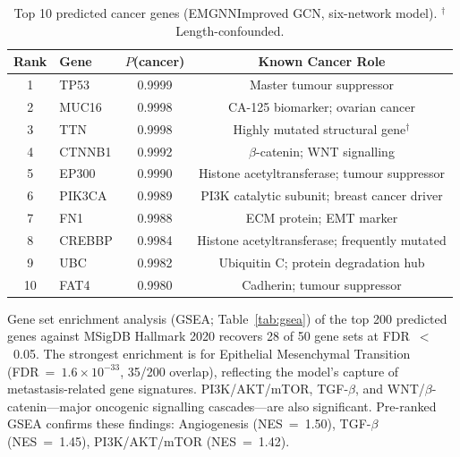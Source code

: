 \begin{table}[ht]
  \centering
  \caption{Top 10 predicted cancer genes (EMGNNImproved GCN, six-network model).
           $^\dagger$Length-confounded.}
  \label{tab:topgenes}
  \small
  \begin{tabular}{clcc}
    \toprule
    \textbf{Rank} & \textbf{Gene} & \textbf{$P$(cancer)} & \textbf{Known Cancer Role} \\
    \midrule
     1 & TP53   & 0.9999 & Master tumour suppressor \\
     2 & MUC16  & 0.9998 & CA-125 biomarker; ovarian cancer \\
     3 & TTN    & 0.9998 & Highly mutated structural gene$^\dagger$ \\
     4 & CTNNB1 & 0.9992 & $\beta$-catenin; WNT signalling \\
     5 & EP300  & 0.9990 & Histone acetyltransferase; tumour suppressor \\
     6 & PIK3CA & 0.9989 & PI3K catalytic subunit; breast cancer driver \\
     7 & FN1    & 0.9988 & ECM protein; EMT marker \\
     8 & CREBBP & 0.9984 & Histone acetyltransferase; frequently mutated \\
     9 & UBC    & 0.9982 & Ubiquitin C; protein degradation hub \\
    10 & FAT4   & 0.9980 & Cadherin; tumour suppressor \\
    \bottomrule
  \end{tabular}
\end{table}

Gene set enrichment analysis (GSEA; Table~\ref{tab:gsea}) of the top 200 predicted
genes against MSigDB Hallmark 2020 recovers 28 of 50 gene sets at FDR~$<$~0.05. The
strongest enrichment is for Epithelial Mesenchymal Transition
(FDR~=~$1.6\times10^{-33}$, 35/200 overlap), reflecting the model's capture of
metastasis-related gene signatures. PI3K/AKT/mTOR, TGF-$\beta$, and
WNT/$\beta$-catenin---major oncogenic signalling cascades---are also significant.
Pre-ranked GSEA confirms these findings: Angiogenesis (NES~=~1.50), TGF-$\beta$
(NES~=~1.45), PI3K/AKT/mTOR (NES~=~1.42).

